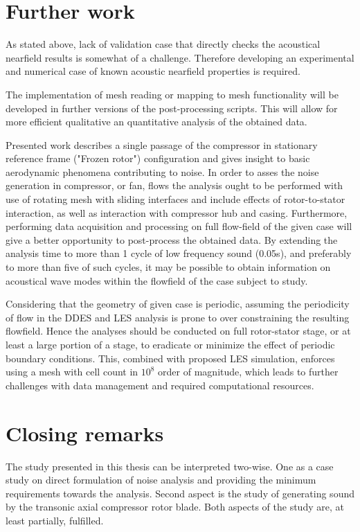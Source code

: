 \section{Further work}
As stated above, lack of validation case that directly checks the acoustical nearfield results is somewhat of a challenge. Therefore developing an experimental and numerical case of known acoustic nearfield properties is required. 

The implementation of mesh reading or mapping to mesh functionality will be developed in further versions of the post-processing scripts. This will allow for more efficient qualitative an quantitative analysis of the obtained data.

Presented work describes a single passage of the compressor in stationary reference frame ("Frozen rotor") configuration and gives insight to basic aerodynamic phenomena contributing to noise. In order to asses the noise generation in compressor, or fan, flows the analysis ought to be performed with use of rotating mesh with sliding interfaces and include effects of rotor-to-stator interaction, as well as interaction with compressor hub and casing. Furthermore, performing data acquisition and processing on full flow-field of the given case will give a better opportunity to post-process the obtained data. By extending the analysis time to more than 1 cycle of low frequency sound (0.05s), and preferably to more than five of such cycles, it may be possible to obtain information on acoustical wave modes within the flowfield of the case subject to study.

Considering that the geometry of given case is periodic, assuming the periodicity of flow in the DDES and LES analysis is prone to over constraining the resulting flowfield. Hence the analyses should be conducted on full rotor-stator stage, or at least a large portion of a stage, to eradicate or minimize the effect of periodic boundary conditions. This, combined with proposed LES simulation, enforces using a mesh with cell count in $10^8$ order of magnitude, which leads to further challenges with data management and required computational resources.

\section{Closing remarks}
The study presented in this thesis can be interpreted two-wise. One as a case study on direct formulation of noise analysis and providing the minimum requirements towards the analysis. Second aspect is the study of generating sound by the transonic axial compressor rotor blade. Both aspects of the study are, at least partially, fulfilled.

